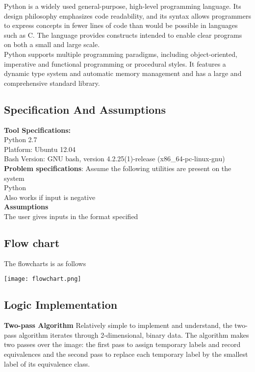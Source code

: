 \documentclass[paper=a4, fontsize=11pt]{scrartcl} %
\numberwithin{equation}{section} %
\numberwithin{figure}{section} %
\numberwithin{table}{section} %
\begin{document}
Python is a widely used general-purpose, high-level programming language. Its design philosophy emphasizes code readability, and its syntax allows programmers to express concepts in fewer lines of code than would be possible in languages such as C. The language provides constructs intended to enable clear programs on both a small and large scale.\\

Python supports multiple programming paradigms, including object-oriented, imperative and functional programming or procedural styles. It features a dynamic type system and automatic memory management and has a large and comprehensive standard library.\\


\subsection{Specification And Assumptions}
{\textbf {Tool Specifications:}}\\
Python 2.7\\
Platform: Ubuntu 12.04\\
Bash Version: GNU bash, version 4.2.25(1)-release (x86\_64-pc-linux-gnu)\\

\textbf{Problem specifications}:
Assume the following utilities are present on the system\\
Python\\
Also works if input is negative\\


{\textbf{Assumptions}}\\
The user gives inputs in the format specified
\newpage
\subsection{Flow chart}
The flowcharts is as follows

 {\center\texttt{[image: flowchart.png]}}\\
\newpage


\subsection{Logic Implementation}
\textbf{Two-pass Algorithm}
Relatively simple to implement and understand, the two-pass algorithm iterates through 2-dimensional, binary data. The algorithm makes two passes over the image: the first pass to assign temporary labels and record equivalences and the second pass to replace each temporary label by the smallest label of its equivalence class.\\
\end{document}
